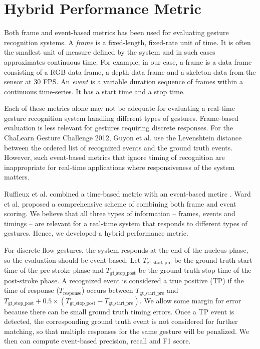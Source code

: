 \section{Hybrid Performance Metric}
Both frame \cite{song12} and event-based \cite{guyon13} metrics has been
used for evaluating gesture recognition systems. A \textit{frame} is a
fixed-length, fixed-rate unit of time. It is often the smallest unit of measure
defined by the system \cite{ward11} and in such cases approximates continuous
time.
For example, in our case, a frame is a data frame consisting of a RGB data frame, a depth data frame and a skeleton data from the
sensor at 30 FPS. An \textit{event} is a variable duration sequence of frames
within a continuous time-series.  It has a start time and a stop time.

Each of these metrics alone may not be adequate for evaluating a real-time
gesture recognition system handling different types of gestures. Frame-based
evaluation is less relevant for gestures requiring discrete responses. For the ChaLearn Gesture Challenge 2012, Guyon et al.
\cite{guyon13} use the Levenshtein distance between the ordered list of
recognized events and the ground truth events. However, such event-based metrics
that ignore timing of recognition are inappropriate for real-time
applications where responsiveness of the system matters.

Ruffieux et al. combined a time-based metric with an event-based metirc
\cite{Ruffieux2013}. Ward et al. \cite{ward11} proposed a comprehensive
scheme of combining both frame and event scoring.
We believe that all three types of information -- frames, events and
timings -- are relevant for a real-time system that responds to different types
of gestures. Hence, we developed a hybrid performance metric.

For discrete flow gestures, the system responds at the end of the nucleus phase,
so the evaluation should be event-based. Let $T_{{\text{gt\_start\_pre}}}$ be
the ground truth start time of the pre-stroke phase and
$T_{{\text{gt\_stop\_post}}}$ be the ground truth stop time of the post-stroke
phase.
A recognized event is considered a true positive (TP) if the time of response ($T_{\text{response}}$) 
occurs between $T_{{\text{gt\_start\_pre}}}$ and $T_{{\text{gt\_stop\_post}}} +
0.5\times(T_{{\text{gt\_stop\_post}}} - T_{\text{gt\_start\_pre}})$. We allow
some margin for error because there can be small ground truth timing errors.
Once a TP event is detected, the corresponding ground truth event is not
considered for further matching, so that multiple responses for the same gesture
will be penalized. We then can compute event-based precision, recall and F1 score.

